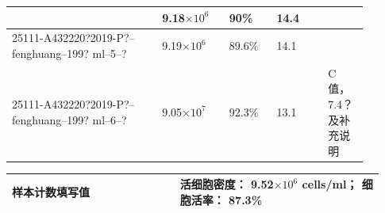 \documentclass[UTF8,10pt,a4paper,fontset=fandol]{ctexart}
\newcommand{\fieldvalue}[1]{#1}
\newcommand{\handwritten}[1]{#1}
\begin{document}
\begin{center}
\begin{tabular}{|p{0.38\linewidth}|p{0.17\linewidth}|p{0.12\linewidth}|p{0.13\linewidth}|p{0.09\linewidth}|}
&
\fieldvalue{\handwritten{9.18}}\(\times10^{6}\)
&
\fieldvalue{\handwritten{90}}\%
&
\fieldvalue{\handwritten{14.4}}
&
\\ \hline
\fieldvalue{\handwritten{\scriptsize 25111-A432220?2019-P?--fenghuang--199? ml--5--?}}
&
\fieldvalue{\handwritten{9.19}}\(\times10^{6}\)
&
\fieldvalue{\handwritten{89.6}}\%
&
\fieldvalue{\handwritten{14.1}}
&
\\ \hline
\fieldvalue{\handwritten{\scriptsize 25111-A432220?2019-P?--fenghuang--199? ml--6--?}}
&
\fieldvalue{\handwritten{9.05}}\(\times10^{7}\)
&
\fieldvalue{\handwritten{92.3}}\%
&
\fieldvalue{\handwritten{13.1}}
&
\fieldvalue{\handwritten{C值，7.4？及补充说明}}
\\ \hline
\end{tabular}

\vspace{2mm}

\begin{tabular}{|p{0.42\linewidth}|p{0.51\linewidth}|}
\hline
\centering 样本计数填写值 &
活细胞密度：
\fieldvalue{\handwritten{9.52}}\(\times10^{6}\) cells/ml；
细胞活率：
\fieldvalue{\handwritten{87.3}}\%
\\ \hline
\end{tabular}
\end{center}
\end{document}
